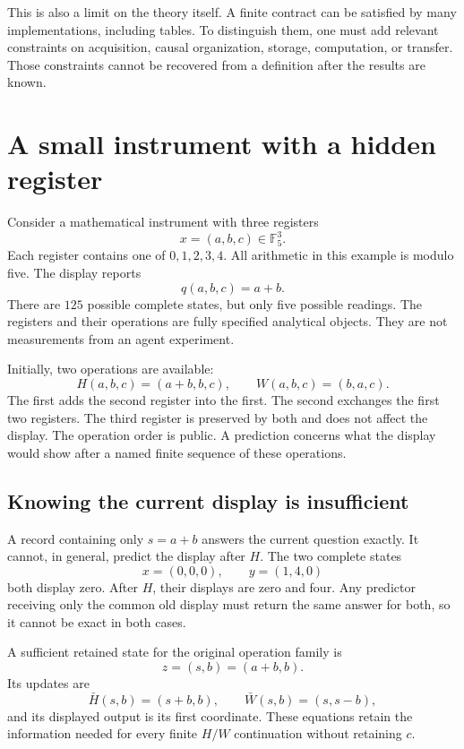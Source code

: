 \documentclass[11pt,letterpaper]{article}
\theoremstyle{plain}
\theoremstyle{definition}
\newcommand{\Ffive}{\mathbb F_5}\newcommand{\TV}{d_{\mathrm{TV}}}
\begin{document}
This is also a limit on the theory itself. A finite contract can be satisfied by many implementations, including tables. To distinguish them, one must add relevant constraints on acquisition, causal organization, storage, computation, or transfer. Those constraints cannot be recovered from a definition after the results are known.

\section{A small instrument with a hidden register}\label{sec:instrument}
Consider a mathematical instrument with three registers
\[
x=(a,b,c)\in\Ffive^3.
\]
Each register contains one of $0,1,2,3,4$. All arithmetic in this example is modulo five. The display reports
\[
q(a,b,c)=a+b.
\]
There are $125$ possible complete states, but only five possible readings. The registers and their operations are fully specified analytical objects. They are not measurements from an agent experiment.

Initially, two operations are available:
\begin{equation}\label{eq:instrument-ops}
H(a,b,c)=(a+b,b,c),\qquad W(a,b,c)=(b,a,c).
\end{equation}
The first adds the second register into the first. The second exchanges the first two registers. The third register is preserved by both and does not affect the display. The operation order is public. A prediction concerns what the display would show after a named finite sequence of these operations.

\subsection{Knowing the current display is insufficient}
A record containing only $s=a+b$ answers the current question exactly. It cannot, in general, predict the display after $H$. The two complete states
\[
x=(0,0,0),\qquad y=(1,4,0)
\]
both display zero. After $H$, their displays are zero and four. Any predictor receiving only the common old display must return the same answer for both, so it cannot be exact in both cases.

A sufficient retained state for the original operation family is
\[
z=(s,b)=(a+b,b).
\]
Its updates are
\begin{equation}\label{eq:display-coordinates}
\bar H(s,b)=(s+b,b),\qquad \bar W(s,b)=(s,s-b),
\end{equation}
and its displayed output is its first coordinate. These equations retain the information needed for every finite $H/W$ continuation without retaining $c$.
\end{document}
